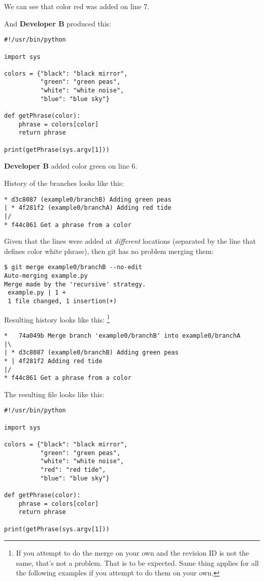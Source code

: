 We can see that color red was added on line 7.

And {\bf Developer B} produced this:
\begin{lstlisting}[style=python_style, caption={\bf Example 0} - Developer B]
#!/usr/bin/python

import sys

colors = {"black": "black mirror",
          "green": "green peas",
          "white": "white noise",
          "blue": "blue sky"}

def getPhrase(color):
    phrase = colors[color]
    return phrase

print(getPhrase(sys.argv[1]))
\end{lstlisting}
{\bf Developer B} added color green on line 6.

History of the branches looks like this:
\begin{lstlisting}[style=branch_history_style, caption={\bf Example 0} - branch history]
* d3c8087 (example0/branchB) Adding green peas
| * 4f281f2 (example0/branchA) Adding red tide
|/  
* f44c861 Get a phrase from a color
\end{lstlisting}

Given that the lines were added at {\it different} locations (separated by the line that defines color white phrase), then git has
no problem merging them:

\begin{lstlisting}[style=console_style, caption={\bf Example 0} - git merge output]
$ git merge example0/branchB --no-edit
Auto-merging example.py
Merge made by the 'recursive' strategy.
 example.py | 1 +
 1 file changed, 1 insertion(+)
\end{lstlisting}

Resulting history looks like this: \footnote{If you attempt to do the merge on your own and the revision ID is not the same,
that's not a problem. That is to be expected. Same thing applies for all the following examples if you attempt to do them on your own.}
\begin{lstlisting}[style=branch_history_style, caption={\bf Example 0} - final branch history]
*   74a049b Merge branch 'example0/branchB' into example0/branchA
|\  
| * d3c8087 (example0/branchB) Adding green peas
* | 4f281f2 Adding red tide
|/  
* f44c861 Get a phrase from a color
\end{lstlisting}

The resulting file looks like this:
\begin{lstlisting}[style=python_style, caption={\bf Example 0} - merged code]
#!/usr/bin/python

import sys

colors = {"black": "black mirror",
          "green": "green peas",
          "white": "white noise",
          "red": "red tide",
          "blue": "blue sky"}

def getPhrase(color):
    phrase = colors[color]
    return phrase

print(getPhrase(sys.argv[1]))
\end{lstlisting}


